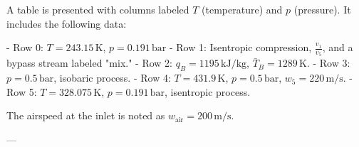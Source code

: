 A table is presented with columns labeled \( T \) (temperature) and \( p \) (pressure). It includes the following data:  

- Row 0: \( T = 243.15 \, \text{K} \), \( p = 0.191 \, \text{bar} \)  
- Row 1: Isentropic compression, \( \frac{v_1}{v_5} \), and a bypass stream labeled "mix."  
- Row 2: \( q_B = 1195 \, \text{kJ/kg} \), \( \bar{T}_B = 1289 \, \text{K} \).  
- Row 3: \( p = 0.5 \, \text{bar} \), isobaric process.  
- Row 4: \( T = 431.9 \, \text{K} \), \( p = 0.5 \, \text{bar} \), \( w_5 = 220 \, \text{m/s} \).  
- Row 5: \( T = 328.075 \, \text{K} \), \( p = 0.191 \, \text{bar} \), isentropic process.  

The airspeed at the inlet is noted as \( w_{\text{air}} = 200 \, \text{m/s} \).  

---